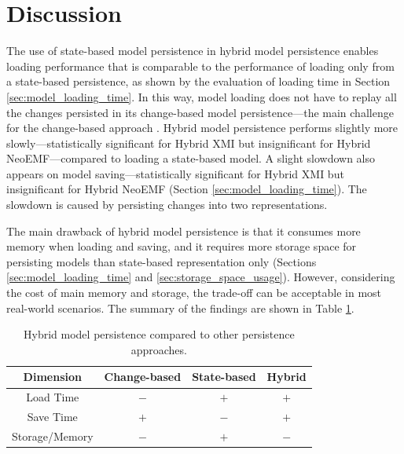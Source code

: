 \section{Discussion}
\label{sec:discussion_5}
The use of state-based model persistence in hybrid model persistence enables loading performance that is comparable to the performance of loading only from a state-based persistence, as shown by the evaluation of loading time in Section \ref{sec:model_loading_time}. In this way, model loading does not have to replay all the changes persisted in its change-based model persistence—the main challenge for the change-based approach \cite{yohannis2018towards, mens2002state}. Hybrid model persistence performs slightly more slowly—statistically significant for Hybrid XMI but insignificant for Hybrid NeoEMF—compared to loading a state-based model. A slight slowdown also appears on model saving—statistically significant for Hybrid XMI but insignificant for Hybrid NeoEMF (Section \ref{sec:model_loading_time}). The slowdown is caused by persisting changes into two representations.

The main drawback of hybrid model persistence is that it consumes more memory when loading and saving, and it requires more storage space for persisting models than state-based representation only (Sections \ref{sec:model_loading_time} and \ref{sec:storage_space_usage}). However, considering the cost of main memory and storage, the trade-off can be acceptable in most real-world scenarios. The summary of the findings are shown in Table \ref{table:persistence_comparison_conclusion}.

\begin{table}[ht]
  \caption{Hybrid model persistence compared to other persistence approaches.}
  \label{table:persistence_comparison_conclusion}
  \centering
  \begin{small}
    \begin{tabular}{ c c c c }
      \hline
      \textbf{Dimension} & \textbf{Change-based} & \textbf{State-based} & \textbf{Hybrid} \\
      \hline
      Load Time & $-$ & $+$ & $+$ \\
      Save Time & $+$ & $-$ & $+$ \\
      Storage/Memory & $-$ & $+$ & $-$ \\
      \hline
    \end{tabular}
  \end{small}
\end{table}

